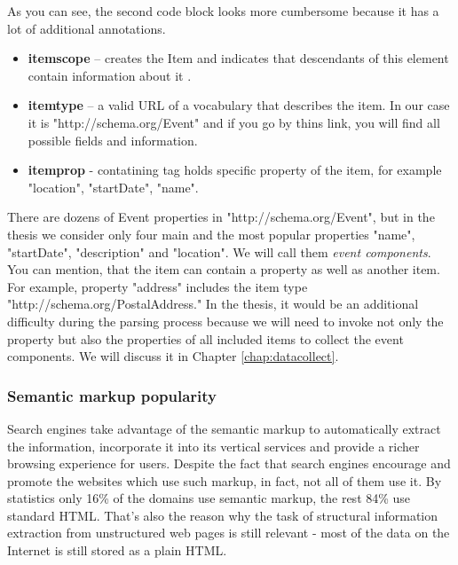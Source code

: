As you can see, the second code block looks more cumbersome because it has a lot of additional annotations. 

\begin{itemize}
    \item \textbf{itemscope} – creates the Item and indicates that descendants of this element contain information about it \cite{Microdata}.
    \item \textbf{itemtype} – a valid URL of a vocabulary that describes the item. In our case it is "http://schema.org/Event" and if you go by thins link, you will find all possible fields and information. 
    \item \textbf{itemprop} - contatining tag holds specific property of the item, for example "location", "startDate", "name".
\end{itemize}

There are dozens of Event properties in "http://schema.org/Event", but in the thesis we consider only four main and the most popular properties "name", "startDate", "description" and "location". We will call them \textit{event components}.\\

You can mention, that the item can contain a property as well as another item. For example, property "address" includes the item type "http://schema.org/PostalAddress." In the thesis, it would be an additional difficulty during the parsing process because we will need to invoke not only the property but also the properties of all included items to collect the event components. We will discuss it in Chapter \ref{chap:datacollect}. 

\subsubsection{Semantic markup popularity}

Search engines take advantage of the semantic markup to automatically extract the information, incorporate it into its vertical services and provide a richer browsing experience for users. Despite the fact that search engines encourage and promote the websites which use such markup, in fact, not all of them use it. By statistics only 16\% of the domains use semantic markup, the rest 84\% use standard HTML. That's also the reason why the task of structural information extraction from unstructured web pages is still relevant - most of the data on the Internet is still stored as a plain HTML.\\ 


